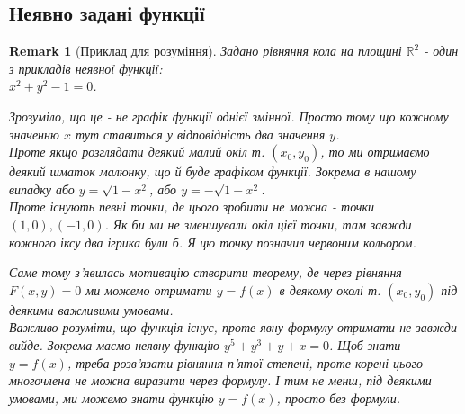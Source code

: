 \documentclass[a4paper, 10pt]{article}
\theoremstyle{theoremdd}
\theoremstyle{theoremdd}
\theoremstyle{theoremdd}
\theoremstyle{theoremdd}
\theoremstyle{theoremdd}
\theoremstyle{theoremdd}
\theoremstyle{theoremdd}
\newtheorem{remark}[theorem]{Remark}
\theoremstyle{theoremdd}
\theoremstyle{theoremdd}
\begin{document}
\subsection{Неявно задані функції}
\begin{remark}[Приклад для розуміння]
Задано рівняння кола на площині $\mathbb{R}^2$ - один з прикладів неявної функції:\\ $x^2+y^2-1=0$.
\begin{figure}[H]
\centering
{}
\end{figure}
Зрозуміло, що це - не графік функції однієї змінної. Просто тому що кожному значенню $x$ тут ставиться у відповідність два значення $y$.\\
Проте якщо розглядати деякий малий окіл т. $(x_0,y_0)$, то ми отримаємо деякий шматок малюнку, що й буде графіком функції. Зокрема в нашому випадку або $y = \sqrt{1-x^2}$, або $y = -\sqrt{1-x^2}$.\\
Проте існують певні точки, де цього зробити не можна - точки $(1,0),(-1,0)$. Як би ми не зменшували окіл цієї точки, там завжди кожного іксу два ігрика були б. Я цю точку позначил червоним кольором.
\begin{figure}[H]
\centering
{}
\end{figure}
Саме тому з'явилась мотивацію створити теорему, де через рівняння $F(x,y) = 0$ ми можемо отримати $y = f(x)$ в деякому околі т. $(x_0,y_0)$ під деякими важливими умовами.
\bigskip \\
Важливо розуміти, що функція існує, проте явну формулу отримати не завжди вийде. Зокрема маємо неявну функцію $y^5+y^3+y+x=0$. Щоб знати $y=f(x)$, треба розв'язати рівняння п'ятої степені, проте корені цього многочлена не можна виразити через формулу. І тим не менш, під деякими умовами, ми можемо знати функцію $y=f(x)$, просто без формули.
\end{remark}
\end{document}
